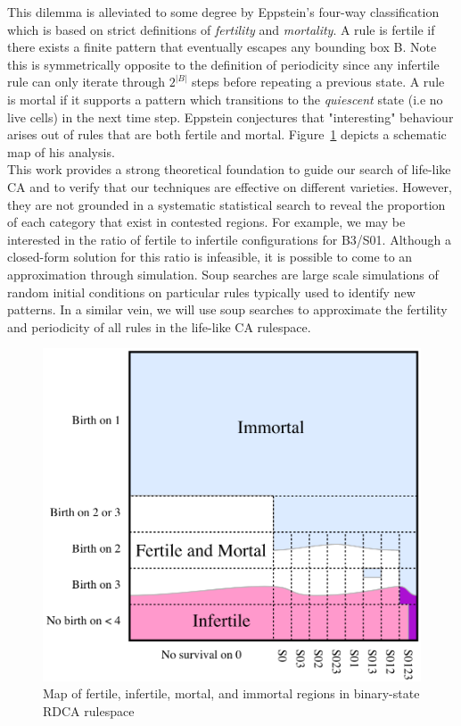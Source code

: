 This dilemma is alleviated to some degree by Eppstein's four-way classification\cite{eppstein2010growth} which is based on strict definitions of \textit{fertility} and \textit{mortality}. A rule is fertile if there exists a finite pattern that eventually escapes any bounding box B. Note this is symmetrically opposite to the definition of periodicity since any infertile rule can only iterate through $2^{|B|}$ steps before repeating a previous state. A rule is mortal if it supports a pattern which transitions to the \textit{quiescent} state (i.e no live cells) in the next time step. Eppstein conjectures that "interesting" behaviour arises out of rules that are both fertile and mortal. Figure~\ref{fig:eppstein-map} depicts a schematic map of his analysis.\\

This work provides a strong theoretical foundation to guide our search of life-like CA and to verify that our techniques are effective on different varieties. However, they are not grounded in a systematic statistical search to reveal the proportion of each category that exist in contested regions. For example, we may be interested in the ratio of fertile to infertile configurations for B3/S01. Although a closed-form solution for this ratio is infeasible, it is possible to come to an approximation through simulation. Soup searches are large scale simulations of random initial conditions on particular rules typically used to identify new patterns. In a similar vein, we will use soup searches to approximate the fertility and periodicity of all rules in the life-like CA rulespace.

\begin{figure}[!h]
\centering
    \includegraphics[width=.5\textwidth]{images/eppstein-map.png}
    \caption{Map of fertile, infertile, mortal, and immortal regions in binary-state RDCA rulespace \cite{eppstein2010growth}}
\label{fig:eppstein-map}
\end{figure}

